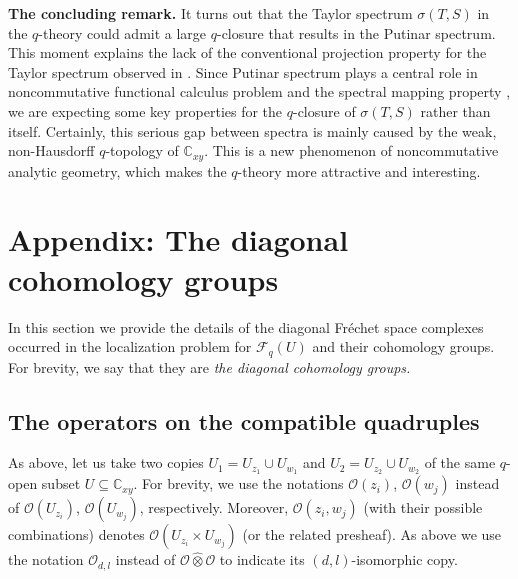 \documentclass[12pt,reqno]{amsart}%
\theoremstyle{plain}
\numberwithin{theorem}{section} \numberwithin{equation}{section}
\numberwithin{lemma}{section}
\numberwithin{remark}{section}
\numberwithin{example}{section}
\numberwithin{proposition}{section}
\numberwithin{definition}{section}
\numberwithin{corollary}{section}
\begin{document}
\textbf{The concluding remark. }It turns out that the Taylor spectrum
$\sigma\left(  T,S\right)  $ in the $q$-theory could admit a large $q$-closure
that results in the Putinar spectrum. This moment explains the lack of the
conventional projection property for the Taylor spectrum observed in
\cite{Dosi242}. Since Putinar spectrum plays a central role in noncommutative
functional calculus problem and the spectral mapping property \cite{DosJOT10},
we are expecting some key properties for the $q$-closure of $\sigma\left(
T,S\right)  $ rather than itself. Certainly, this serious gap between spectra
is mainly caused by the weak, non-Hausdorff $q$-topology of $\mathbb{C}_{xy}$.
This is a new phenomenon of noncommutative analytic geometry, which makes the
$q$-theory more attractive and interesting.

\section{Appendix: The diagonal cohomology groups\label{sectionDCG}}

In this section we provide the details of the diagonal Fr\'{e}chet space
complexes occurred in the localization problem for $\mathcal{F}_{q}\left(
U\right)  $ and their cohomology groups. For brevity, we say that they are
\textit{the diagonal cohomology groups.}

\subsection{The operators on the compatible quadruples\label{subsecQRP}}

As above, let us take two copies $U_{1}=U_{z_{1}}\cup U_{w_{1}}$ and
$U_{2}=U_{z_{2}}\cup U_{w_{2}}$ of the same $q$-open subset $U\subseteq
\mathbb{C}_{xy}$. For brevity, we use the notations $\mathcal{O}\left(
z_{i}\right)  $, $\mathcal{O}\left(  w_{j}\right)  $ instead of $\mathcal{O}%
\left(  U_{z_{i}}\right)  $, $\mathcal{O}\left(  U_{w_{j}}\right)  $,
respectively. Moreover, $\mathcal{O}\left(  z_{i},w_{j}\right)  $ (with their
possible combinations) denotes $\mathcal{O}\left(  U_{z_{i}}\times U_{w_{j}%
}\right)  $ (or the related presheaf). As above we use the notation
$\mathcal{O}_{d,l}$ instead of $\mathcal{O}\widehat{\otimes}\mathcal{O}$ to
indicate its $\left(  d,l\right)  $-isomorphic copy.
\end{document}
